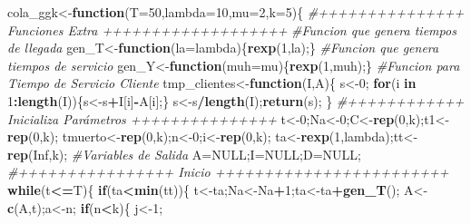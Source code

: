 \documentclass[]{article}
\newenvironment{Shaded}{\begin{snugshade}}{\end{snugshade}}
\newcommand{\KeywordTok}[1]{\textcolor[rgb]{0.13,0.29,0.53}{\textbf{#1}}}
\newcommand{\DataTypeTok}[1]{\textcolor[rgb]{0.13,0.29,0.53}{#1}}
\newcommand{\DecValTok}[1]{\textcolor[rgb]{0.00,0.00,0.81}{#1}}
\newcommand{\CommentTok}[1]{\textcolor[rgb]{0.56,0.35,0.01}{\textit{#1}}}
\newcommand{\OtherTok}[1]{\textcolor[rgb]{0.56,0.35,0.01}{#1}}
\newcommand{\ControlFlowTok}[1]{\textcolor[rgb]{0.13,0.29,0.53}{\textbf{#1}}}
\newcommand{\OperatorTok}[1]{\textcolor[rgb]{0.81,0.36,0.00}{\textbf{#1}}}
\newcommand{\NormalTok}[1]{#1}
\begin{document}
\begin{Shaded}
\begin{Highlighting}[]
\NormalTok{cola_ggk<-}\ControlFlowTok{function}\NormalTok{(}\DataTypeTok{T=}\DecValTok{50}\NormalTok{,}\DataTypeTok{lambda=}\DecValTok{10}\NormalTok{,}\DataTypeTok{mu=}\DecValTok{2}\NormalTok{,}\DataTypeTok{k=}\DecValTok{5}\NormalTok{)\{}
  \CommentTok{#+++++++++++++++ Funciones Extra +++++++++++++++++++}
  \CommentTok{#Funcion que genera tiempos de llegada }
\NormalTok{  gen_T<-}\ControlFlowTok{function}\NormalTok{(}\DataTypeTok{la=}\NormalTok{lambda)\{}\KeywordTok{rexp}\NormalTok{(}\DecValTok{1}\NormalTok{,la);\}}
  \CommentTok{#Funcion que genera tiempos de servicio}
\NormalTok{  gen_Y<-}\ControlFlowTok{function}\NormalTok{(}\DataTypeTok{muh=}\NormalTok{mu)\{}\KeywordTok{rexp}\NormalTok{(}\DecValTok{1}\NormalTok{,muh);\}}
  \CommentTok{#Funcion para Tiempo de Servicio Cliente}
\NormalTok{  tmp_clientes<-}\ControlFlowTok{function}\NormalTok{(I,A)\{}
\NormalTok{    s<-}\DecValTok{0}\NormalTok{;}
    \ControlFlowTok{for}\NormalTok{(i }\ControlFlowTok{in} \DecValTok{1}\OperatorTok{:}\KeywordTok{length}\NormalTok{(I))\{s<-s}\OperatorTok{+}\NormalTok{I[i]}\OperatorTok{-}\NormalTok{A[i];\}}
\NormalTok{    s<-s}\OperatorTok{/}\KeywordTok{length}\NormalTok{(I);}\KeywordTok{return}\NormalTok{(s);}
\NormalTok{  \}}
  \CommentTok{#++++++++++++  Inicializa Parámetros  +++++++++++++++}
\NormalTok{  t<-}\DecValTok{0}\NormalTok{;Na<-}\DecValTok{0}\NormalTok{;C<-}\KeywordTok{rep}\NormalTok{(}\DecValTok{0}\NormalTok{,k);t1<-}\KeywordTok{rep}\NormalTok{(}\DecValTok{0}\NormalTok{,k);}
\NormalTok{  tmuerto<-}\KeywordTok{rep}\NormalTok{(}\DecValTok{0}\NormalTok{,k);n<-}\DecValTok{0}\NormalTok{;i<-}\KeywordTok{rep}\NormalTok{(}\DecValTok{0}\NormalTok{,k);}
\NormalTok{  ta<-}\KeywordTok{rexp}\NormalTok{(}\DecValTok{1}\NormalTok{,lambda);tt<-}\KeywordTok{rep}\NormalTok{(}\OtherTok{Inf}\NormalTok{,k);}
  \CommentTok{#Variables de Salida}
\NormalTok{  A=}\OtherTok{NULL}\NormalTok{;I=}\OtherTok{NULL}\NormalTok{;D=}\OtherTok{NULL}\NormalTok{;}
  \CommentTok{#++++++++++++++++  Inicio  ++++++++++++++++++++++++}
  \ControlFlowTok{while}\NormalTok{(t}\OperatorTok{<=}\NormalTok{T)\{}
    \ControlFlowTok{if}\NormalTok{(ta}\OperatorTok{<}\KeywordTok{min}\NormalTok{(tt))\{}
\NormalTok{      t<-ta;Na<-Na}\OperatorTok{+}\DecValTok{1}\NormalTok{;ta<-ta}\OperatorTok{+}\KeywordTok{gen_T}\NormalTok{();}
\NormalTok{      A<-}\KeywordTok{c}\NormalTok{(A,t);a<-n;}
      \ControlFlowTok{if}\NormalTok{(n}\OperatorTok{<}\NormalTok{k)\{}
\NormalTok{        j<-}\DecValTok{1}\NormalTok{;}

\end{Highlighting}
\end{Shaded}
\end{document}
